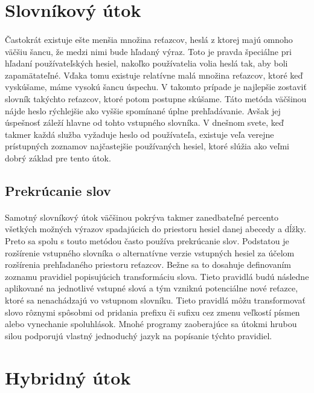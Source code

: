 \section{Slovníkový útok}
\paragraph{}
Častokrát existuje ešte menšia množina reťazcov, heslá z ktorej majú omnoho väčšiu šancu, že medzi nimi bude hľadaný výraz. Toto je pravda špeciálne pri hľadaní používateľských hesiel, nakoľko používatelia volia heslá tak, aby boli zapamätateľné. Vďaka tomu existuje relatívne malá množina reťazcov, ktoré keď vyskúšame, máme vysokú šancu úspechu. V takomto prípade je najlepšie zostaviť slovník takýchto reťazcov, ktoré potom postupne skúšame. Táto metóda väčšinou nájde heslo rýchlejšie ako vyššie spomínané úplne prehľadávanie. Avšak jej úspešnosť záleží hlavne od tohto vstupného slovníka. V dnešnom svete, keď takmer každá služba vyžaduje heslo od používateľa, existuje veľa verejne prístupných zoznamov najčastejšie používaných hesiel, ktoré slúžia ako veľmi dobrý základ pre tento útok.

\subsection{Prekrúcanie slov}
\paragraph{}
Samotný slovníkový útok väčšinou pokrýva takmer zanedbateľné percento všetkých možných výrazov spadajúcich do priestoru hesiel danej abecedy a dĺžky. Preto sa spolu s touto metódou často používa prekrúcanie slov. Podstatou je rozšírenie vstupného slovníka o alternatívne verzie vstupných hesiel za účelom rozšírenia prehľadaného priestoru reťazcov. Bežne sa to dosahuje definovaním zoznamu pravidiel popisujúcich transformáciu slova. Tieto pravidlá budú následne aplikované na jednotlivé vstupné slová a tým vzniknú potenciálne nové reťazce, ktoré sa nenachádzajú vo vstupnom slovníku. Tieto pravidlá môžu transformovať slovo rôznymi spôsobmi od pridania prefixu či sufixu cez zmenu veľkostí písmen alebo vynechanie spoluhlások. Mnohé programy zaoberajúce sa útokmi hrubou silou podporujú vlastný jednoduchý jazyk na popísanie týchto pravidiel.

\section{Hybridný útok}
